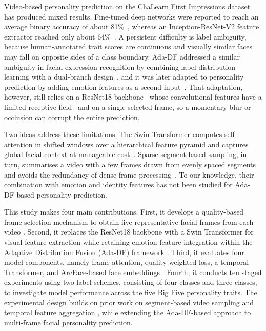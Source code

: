 \documentclass[10pt,a4paper,twocolumn]{article}
\begin{document}
Video-based personality prediction on the ChaLearn First Impressions dataset has produced mixed results. Fine-tuned deep networks were reported to reach an average binary accuracy of about 81\%~\cite{tiwari}, whereas an Inception-ResNet-V2 feature extractor reached only about 64\%~\cite{lizama}. A persistent difficulty is label ambiguity, because human-annotated trait scores are continuous and visually similar faces may fall on opposite sides of a class boundary. Ada-DF addressed a similar ambiguity in facial expression recognition by combining label distribution learning with a dual-branch design~\cite{liu_adadf}, and it was later adapted to personality prediction by adding emotion features as a second input~\cite{wardana}. That adaptation, however, still relies on a ResNet18 backbone~\cite{he} whose convolutional features have a limited receptive field~\cite{gu} and on a single selected frame, so a momentary blur or occlusion can corrupt the entire prediction.

Two ideas address these limitations. The Swin Transformer computes self-attention in shifted windows over a hierarchical feature pyramid and captures global facial context at manageable cost~\cite{swin}. Sparse segment-based sampling, in turn, summarises a video with a few frames drawn from evenly spaced segments and avoids the redundancy of dense frame processing~\cite{tsn,karpathy}. To our knowledge, their combination with emotion and identity features has not been studied for Ada-DF-based personality prediction.

This study makes four main contributions. First, it develops a quality-based frame selection mechanism to obtain five representative facial frames from each video \cite{liu_adadf}. Second, it replaces the ResNet18 backbone with a Swin Transformer for visual feature extraction while retaining emotion feature integration within the Adaptive Distribution Fusion (Ada-DF) framework \cite{wardana,swin}. Third, it evaluates four model components, namely frame attention, quality-weighted loss, a temporal Transformer, and ArcFace-based face embeddings \cite{arcface}. Fourth, it conducts ten staged experiments using two label schemes, consisting of four classes and three classes, to investigate model performance across the five Big Five personality traits. The experimental design builds on prior work on segment-based video sampling and temporal feature aggregation \cite{tsn,karpathy}, while extending the Ada-DF-based approach to multi-frame facial personality prediction.
\end{document}
